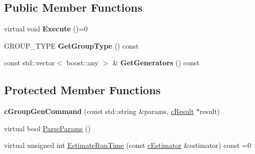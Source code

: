 \subsection*{\-Public \-Member \-Functions}
\begin{DoxyCompactItemize}
\item 
\hypertarget{classengine_1_1cGroupGenCommand_afba1ce51b5ffcebaf93febe1a982b207}{virtual void {\bfseries \-Execute} ()=0}\label{classengine_1_1cGroupGenCommand_afba1ce51b5ffcebaf93febe1a982b207}

\item 
\hypertarget{classengine_1_1cGroupGenCommand_ad00e8df48529e28c0b2310c8a6b08124}{\-G\-R\-O\-U\-P\-\_\-\-T\-Y\-P\-E {\bfseries \-Get\-Group\-Type} () const }\label{classengine_1_1cGroupGenCommand_ad00e8df48529e28c0b2310c8a6b08124}

\item 
\hypertarget{classengine_1_1cGroupGenCommand_a423b76a5c2dbf49db40655f968f15758}{const std\-::vector$<$ boost\-::any $>$ \& {\bfseries \-Get\-Generators} () const }\label{classengine_1_1cGroupGenCommand_a423b76a5c2dbf49db40655f968f15758}

\end{DoxyCompactItemize}
\subsection*{\-Protected \-Member \-Functions}
\begin{DoxyCompactItemize}
\item 
\hypertarget{classengine_1_1cGroupGenCommand_a155c6d2cf3ed40f2c507aa3f89c9db30}{{\bfseries c\-Group\-Gen\-Command} (const std\-::string \&params, \hyperlink{classengine_1_1cResult}{c\-Result} $\ast$result)}\label{classengine_1_1cGroupGenCommand_a155c6d2cf3ed40f2c507aa3f89c9db30}

\item 
virtual bool \hyperlink{classengine_1_1cGroupGenCommand_a47e527898bf1ef6cba0c9c01b6173d13}{\-Parse\-Params} ()
\item 
virtual unsigned int \hyperlink{classengine_1_1cGroupGenCommand_aba96a75b873e66979b653f4e27540f3f}{\-Estimate\-Run\-Time} (const \hyperlink{classengine_1_1cEstimator}{c\-Estimator} \&estimator) const =0
\end{DoxyCompactItemize}

